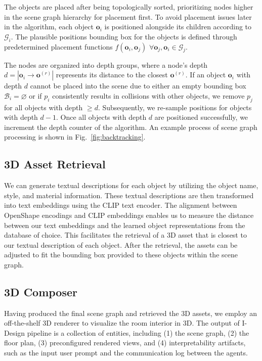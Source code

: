 \documentclass[runningheads]{llncs}
\newcommand{\methodname}{I-Design\xspace}
\begin{document}
The objects are placed after being topologically sorted, prioritizing nodes higher in the scene graph hierarchy for placement first. To avoid placement issues later in the algorithm, each object \(\mathbf{o}_i\) is positioned alongside its children according to \(\mathcal{G}_i\). 
The plausible positions bounding box for the objects is defined through predetermined placement functions \( f(\mathbf{o}_i, \mathbf{o}_j)\) \( \forall \mathbf{o}_j, \mathbf{o}_i \in \mathcal{G}_j \). 

The nodes are organized into depth groups, where a node's depth \(d = |\mathbf{o}_i \rightarrow \textbf{o}^{(r)}|\) represents its distance to the closest \(\textbf{o}^{(r)}\). If an object \(\textbf{o}_i\) with depth \(d\) cannot be placed into the scene due to either an empty bounding box \(\mathcal{B}_i = \varnothing\) or if \(p_i\) consistently results in collisions with other objects, we remove \(p_j\) for all objects with depth \(\geq d\). Subsequently, we re-sample positions for objects with depth \(d-1\). Once all objects with depth \(d\) are positioned successfully, we increment the depth counter of the algorithm. An example process of scene graph processing is shown in Fig.~\ref{fig:backtracking}.



\subsection{3D Asset Retrieval} 
\label{sec:retrieval}

We can generate textual descriptions for each object by utilizing the object name, style, and material information. 
These textual descriptions are then transformed into text embeddings using the CLIP \cite{radford2021learning} text encoder. 
The alignment between OpenShape \cite{liu2024openshape} encodings and CLIP embeddings enables us to measure the distance between our text embeddings and the learned object representations from the database of choice. 
This facilitates the retrieval of a 3D asset that is closest to our textual description of each object. 
After the retrieval, the assets can be adjusted to fit the bounding box provided to these objects within the scene graph.

\subsection{3D Composer} 
\label{sec:composer}

Having produced the final scene graph and retrieved the 3D assets, we employ an off-the-shelf 3D renderer to visualize the room interior in 3D.
The output of \methodname pipeline is a collection of entities, including (1) the scene graph, (2) the floor plan, (3) preconfigured rendered views, and (4) interpretability artifacts, such as the input user prompt and the communication log between the agents.
\end{document}
